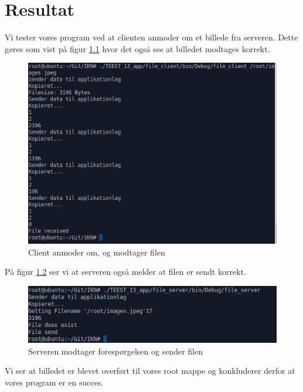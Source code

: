 \chapter{Resultat}

Vi tester vores program ved at clienten anmoder om et billede fra serveren. Dette gøres som vist på figur \ref{fig:testing} hvor det også ses at billedet modtages korrekt.

\begin{figure}[htbp]
	\centering
	\includegraphics[width=0.9\linewidth]{Subpages/Billeder/client_done}
	\caption{Client anmoder om, og modtager filen}
	\label{fig:testing}
\end{figure}

På figur \ref{fig:testing_server} ser vi at serveren også melder at filen er sendt korrekt. %

\begin{figure}[htbp]
	\centering
	\includegraphics[width=0.9\linewidth]{Subpages/Billeder/server_done}
	\caption{Serveren modtager forespørgelsen og sender filen}
	\label{fig:testing_server}
\end{figure}

Vi ser at billedet er blevet overført til vores root mappe og konkluderer derfor at vores program er en succes.